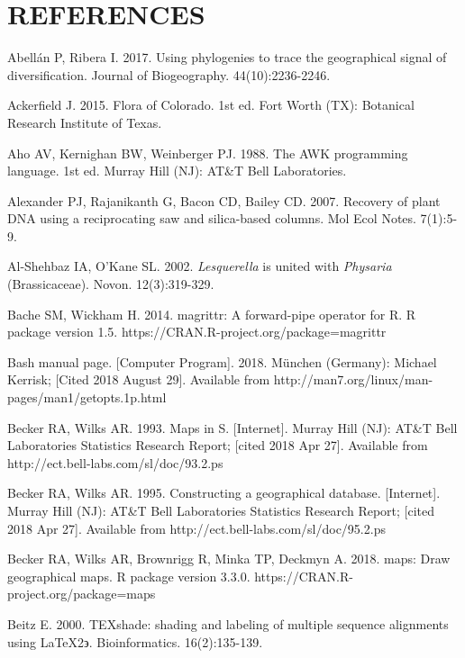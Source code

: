 \chapter*{REFERENCES}
\vspace*{-12pt}

\setlength{\parindent}{-4em}
\setlength{\leftskip}{4em}
\setlength{\parskip}{12pt}
\singlespacing

\hspace*{-4em}Abellán P, Ribera I. 2017. Using phylogenies to trace the geographical signal of diversification. Journal of Biogeography. 44(10):2236-2246.

Ackerfield J. 2015. Flora of Colorado. 1st ed. Fort Worth (TX): Botanical Research Institute of Texas.

Aho AV, Kernighan BW, Weinberger PJ. 1988. The AWK programming language. 1st ed. Murray Hill (NJ): AT\&T Bell Laboratories.

Alexander PJ, Rajanikanth G, Bacon CD, Bailey CD. 2007. Recovery of plant DNA using a reciprocating saw and silica-based columns. Mol Ecol Notes. 7(1):5-9.

Al-Shehbaz IA, O’Kane SL. 2002. \textit{Lesquerella} is united with \textit{Physaria} (Brassicaceae). Novon. 12(3):319-329.

Bache SM, Wickham H. 2014. magrittr: A forward-pipe operator for R. R package version 1.5. https://CRAN.R-project.org/package=magrittr

Bash manual page. [Computer Program]. 2018. München (Germany): Michael Kerrisk; [Cited 2018 August 29].  Available from http://man7.org/linux/man-pages/man1/getopts.1p.html

Becker RA, Wilks AR. 1993. Maps in S. [Internet]. Murray Hill (NJ): AT\&T Bell Laboratories Statistics Research Report; [cited 2018 Apr 27]. Available from http://ect.bell-labs.com/sl/doc/93.2.ps

Becker RA, Wilks AR. 1995. Constructing a geographical database. [Internet]. Murray Hill (NJ): AT\&T Bell Laboratories Statistics Research Report; [cited 2018 Apr 27]. Available from http://ect.bell-labs.com/sl/doc/95.2.ps

Becker RA, Wilks AR, Brownrigg R, Minka TP, Deckmyn A. 2018. maps: Draw geographical maps. R package version 3.3.0. https://CRAN.R-project.org/package=maps

Beitz E. 2000. TEXshade: shading and labeling of multiple sequence alignments using \LaTeX 2$\backepsilon$. Bioinformatics. 16(2):135-139.

